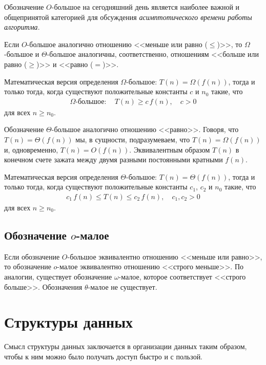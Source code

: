 \documentclass[%
	11pt,
	a4paper,
	utf8,
		]{article}
\begin{document}
Обозначение $ O $-большое на сегодняшний день является наиболее важной и общепринятой категорией для обсуждения \emph{асимптотического времени работы алгоритма}.

Если $ O $-большое аналогично отношению <<меньше или равно ($ \leqslant $)>>, то $ \Omega $-большое и $ \Theta $-большое аналогичны, соответственно, отношениям <<больше или равно ($ \geqslant $)>> и <<равно ($ = $)>>.

Математическая версия определения $ \Omega $-большое: $ T(n) = \Omega(f(n)) $, тогда и только тогда, когда существуют положительные константы $ c $ и $ n_0 $ такие, что
\begin{align*}
	\Omega\textit{-большое}: \quad T(n) \geqslant c\,f(n), \quad c > 0
\end{align*}
для всех $ n \geqslant n_0 $.

Обозначение $ \Theta $-большое аналогично отношению <<равно>>. Говоря, что $ T(n) = \Theta(f(n)) $ мы, в сущности, подразумеваем, что $ T(n) = \Omega(f(n)) $ и, одновременно, $ T(n) = O(f(n)) $. Эквивалентным образом $ T(n) $ в конечном счете зажата между двумя разными постоянными кратными $ f(n) $.

Математическая версия определения $ \Theta $-большое: $ T(n) = \Theta(f(n)) $, тогда и только тогда, когда существуют положительные константы $ c_1 $, $ c_2 $ и $ n_0 $ такие, что
\begin{align*}
	c_1\,f(n) \leqslant T(n) \leqslant c_2\,f(n), \quad c_1, c_2 > 0
\end{align*}
для всех $ n \geqslant n_0 $.

\subsection{Обозначение $ o $-малое}

Если обозначение $ O $-большое эквивалентно отношению <<меньше или равно>>, то обозначение $ o $-малое эквивалентно отношению <<строго меньше>>. По аналогии, существует обозначение $\omega$-малое, которое соответствует <<строго больше>>. Обозначения $ \theta $-малое не существует.


\section{Структуры данных}

Смысл структуры данных заключается в организации данных таким образом, чтобы к ним можно было получать доступ быстро и с пользой.
\end{document}
